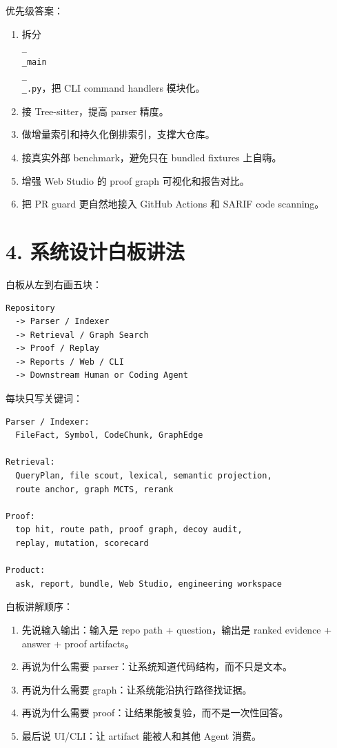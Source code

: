 \documentclass[UTF8,12pt,openany]{ctexbook}
\begin{document}
优先级答案：\par

\begin{enumerate}
\item 拆分 \texttt{\\_\\_main\\_\\_.py}，把 CLI command handlers 模块化。
\item 接 Tree-sitter，提高 parser 精度。
\item 做增量索引和持久化倒排索引，支撑大仓库。
\item 接真实外部 benchmark，避免只在 bundled fixtures 上自嗨。
\item 增强 Web Studio 的 proof graph 可视化和报告对比。
\item 把 PR guard 更自然地接入 GitHub Actions 和 SARIF code scanning。
\end{enumerate}

\section{4. 系统设计白板讲法}

白板从左到右画五块：\par

\begin{lstlisting}
Repository
  -> Parser / Indexer
  -> Retrieval / Graph Search
  -> Proof / Replay
  -> Reports / Web / CLI
  -> Downstream Human or Coding Agent
\end{lstlisting}

每块只写关键词：\par

\begin{lstlisting}
Parser / Indexer:
  FileFact, Symbol, CodeChunk, GraphEdge

Retrieval:
  QueryPlan, file scout, lexical, semantic projection,
  route anchor, graph MCTS, rerank

Proof:
  top hit, route path, proof graph, decoy audit,
  replay, mutation, scorecard

Product:
  ask, report, bundle, Web Studio, engineering workspace
\end{lstlisting}

白板讲解顺序：\par

\begin{enumerate}
\item 先说输入输出：输入是 repo path + question，输出是 ranked evidence + answer + proof artifacts。
\item 再说为什么需要 parser：让系统知道代码结构，而不只是文本。
\item 再说为什么需要 graph：让系统能沿执行路径找证据。
\item 再说为什么需要 proof：让结果能被复验，而不是一次性回答。
\item 最后说 UI/CLI：让 artifact 能被人和其他 Agent 消费。
\end{enumerate}
\end{document}

